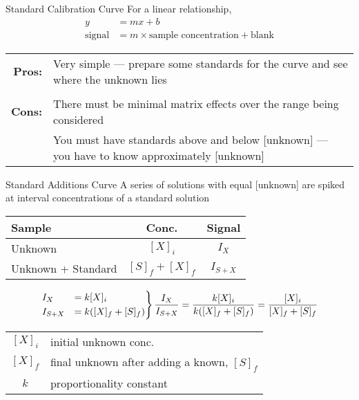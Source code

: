 \documentclass[handout]{beamer}
\begin{document}
\begin{frame}{Standard Calibration Curve}
	For a \alert{linear} relationship,
	\begin{align*}
		y &= mx + b \\
		\text{signal} &= m \times \text{sample concentration} +
		\text{blank}
	\end{align*}

	\begin{tabularx}{\linewidth} {>{\bfseries}r X}
		Pros: &
		Very simple --- prepare some standards for the curve
		and see where the unknown lies \\ \\
		Cons: &
		There must be minimal \alert{matrix effects} over the
		range being considered \\
		      & You must have standards above and below
		      [unknown] --- you
			have to know approximately [unknown] \\
	\end{tabularx}
\end{frame}

\begin{frame}[t]{Standard Additions Curve}
	A series of solutions with equal [unknown] are spiked at
	interval concentrations of a standard solution

	\begin{center}
	\begin{tabular} {l c c}
		\toprule
		\bfseries Sample & \bfseries Conc. & \bfseries Signal \\ \midrule
		Unknown & $[X]_i$ & $I_X$ \\
		Unknown + Standard & $[S]_f + [X]_f$ & $I_{S+X}$ \\ \bottomrule
	\end{tabular}
	\end{center}

	\begin{align*}
		\begin{rcases}
		I_X &= k[X]_i \\
		I_{S+X} &= k([X]_f + [S]_f)
		\end{rcases} \dfrac{I_X}{I_{S+X}} = \dfrac{k[X]_i}{k([X]_f +
		[S]_f)} = \dfrac{[X]_i}{[X]_f + [S]_f}
	\end{align*}

	\begin{center}
	\begin{tabular} {c l}
		$[X]_i$ & initial unknown conc. \\
		$[X]_f$ & final unknown after adding a known, $[S]_f$ \\
		$k$ & proportionality constant
	\end{tabular}
	\end{center}
\end{frame}
\end{document}
